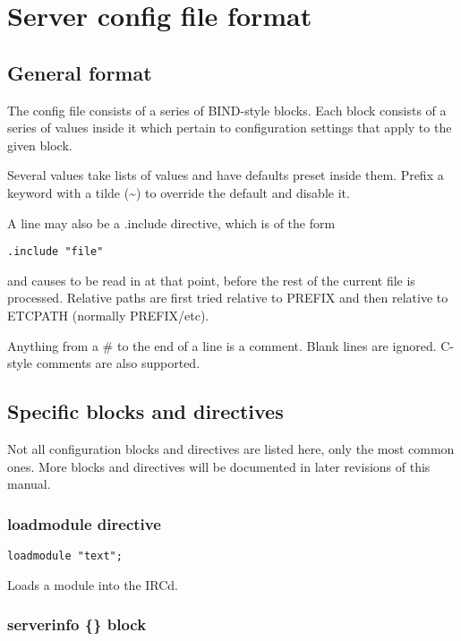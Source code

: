 \chapter{Server config file format}
\label{config}

\section{General format}

	The config file consists of a series of BIND-{}style blocks. Each block
	consists of a series of values inside it which pertain to configuration
	settings that apply to the given block.

	Several values take lists of values and have defaults preset inside
	them. Prefix a keyword with a tilde (\textasciitilde{}) to override the
	default and disable it.

	A line may also be a .include directive, which is of the form
\begin{verbatim}.include "file"\end{verbatim}
	and causes  to be read in at that point, before the
	rest of the current file is processed. Relative paths are first tried
	relative to PREFIX and then relative to ETCPATH (normally PREFIX/etc).

	Anything from a \# to the end of a line is a comment. Blank lines are
	ignored. C-{}style comments are also supported.


\section{Specific blocks and directives}
\label{configlines}

	Not all configuration blocks and directives are listed here, only the
	most common ones. More blocks and directives will be documented in
	later revisions of this manual.


\subsection{loadmodule directive}

\begin{verbatim}
loadmodule "text";\end{verbatim}

	Loads a module into the IRCd.


\subsection{serverinfo \{\} block}

